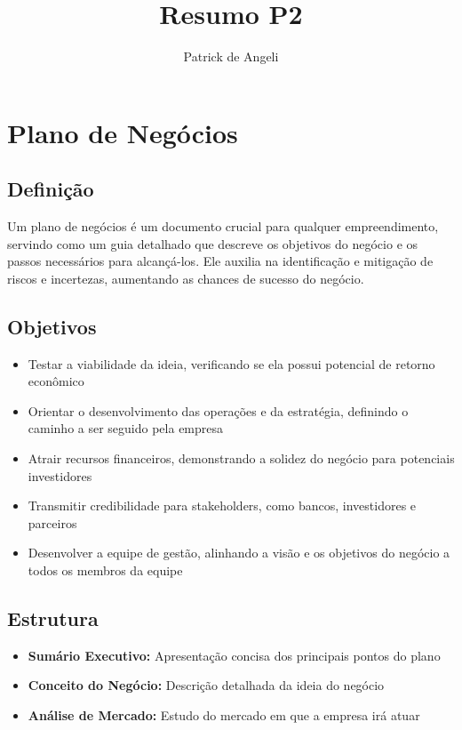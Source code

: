 \documentclass{article}
\title{Resumo P2}
\author{Patrick de Angeli}
\date{}
\begin{document}
\maketitle
\tableofcontents  %
\newpage          %


\section{Plano de Negócios}

\subsection{Definição}
Um plano de negócios é um documento crucial para qualquer empreendimento, servindo como um guia detalhado que descreve os objetivos do negócio e os passos necessários para alcançá-los. Ele auxilia na identificação e mitigação de riscos e incertezas, aumentando as chances de sucesso do negócio.

\subsection{Objetivos}
\begin{itemize}
    \item Testar a viabilidade da ideia, verificando se ela possui potencial de retorno econômico
    \item Orientar o desenvolvimento das operações e da estratégia, definindo o caminho a ser seguido pela empresa
    \item Atrair recursos financeiros, demonstrando a solidez do negócio para potenciais investidores
    \item Transmitir credibilidade para stakeholders, como bancos, investidores e parceiros
    \item Desenvolver a equipe de gestão, alinhando a visão e os objetivos do negócio a todos os membros da equipe
\end{itemize}

\subsection{Estrutura}
\begin{itemize}
    \item \textbf{Sumário Executivo:} Apresentação concisa dos principais pontos do plano
    \item \textbf{Conceito do Negócio:} Descrição detalhada da ideia do negócio
    \item \textbf{Análise de Mercado:} Estudo do mercado em que a empresa irá atuar
\end{itemize}
\end{document}
